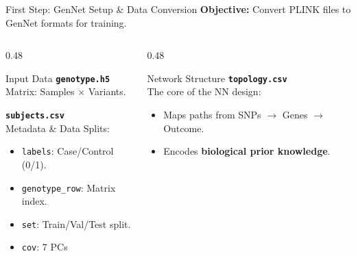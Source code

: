 \documentclass[aspectratio=169]{beamer}
\begin{document}
\begin{frame}{First Step: GenNet Setup \& Data Conversion}
    \small
    \textbf{Objective:} Convert PLINK files to GenNet formats for training.

    \vspace{0.4cm}

    \begin{columns}[T]
        \begin{column}{0.48\textwidth}
            \begin{block}{Input Data}
                \textbf{\texttt{genotype.h5}} \\
                Matrix: Samples $\times$ Variants.

                \vspace{0.3cm}

                \textbf{\texttt{subjects.csv}} \\
                Metadata \& Data Splits:
                \begin{itemize}
                    \item \texttt{labels}: Case/Control (0/1).
                    \item \texttt{genotype\_row}: Matrix index.
                    \item \texttt{set}: Train/Val/Test split.
                    \item \texttt{cov}: 7 PCs \cite{Ellinghaus2016}
                \end{itemize}
            \end{block}
        \end{column}

        \begin{column}{0.48\textwidth}
            \begin{block}{Network Structure}
                \textbf{\texttt{topology.csv}} \\
                The core of the NN design:
                \begin{itemize}
                    \item Maps paths from SNPs $\rightarrow$ Genes $\rightarrow$ Outcome.
                    \item Encodes \textbf{biological prior knowledge}.
                \end{itemize}
            \end{block}
        \end{column}
    \end{columns}
\end{frame}
\end{document}
